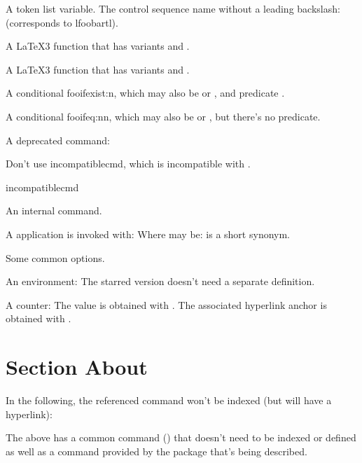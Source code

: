 \documentclass[titlepage=false,oneside,
 fontsize=12pt,captions=tableheading]{scrbook}
\begin{document}
A  token list variable.
The control sequence name without a leading backslash:
 (corresponds to
\gls{lfoobartl}).

A \LaTeX3 function that has variants  and
.

A \LaTeX3 function that has variants  and
.

A conditional \gls{fooifexist:n}, which may also be
 or , and predicate
.

A conditional \gls{fooifeq:nn}, which may also be
 or , but there's no
predicate.

A deprecated command:


Don't use \gls{incompatiblecmd}, which is incompatible with
.
\begin{badcodebox}
\gls{incompatiblecmd}
\end{badcodebox}

An internal command.

A  application  is invoked with:
Where  may be:
 is a short synonym.

Some common options.


An environment:
The starred version  doesn't need a separate
definition.

A counter:
The value is obtained with . The associated
hyperlink anchor is obtained with .

\section{Section About }

In the following, the referenced command won't be indexed (but will
have a hyperlink):
\begin{codebox}
\end{codebox}
The above has a common command () that doesn't
need to be indexed or defined as well as a command provided by the
package that's being described.
\end{document}
